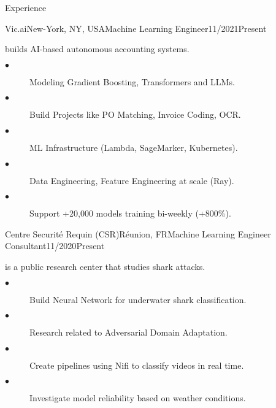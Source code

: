 \documentclass{resume}
\begin{document}
\begin{multicols}{2}
	\begin{rSection}{\Large Experience}
	
		\begin{job}{Vic.ai}{New-York, NY, USA}{Machine Learning Engineer}{11/2021}{Present}{
			builds AI-based autonomous accounting systems.
			\begin{description}
				\item[$\bullet$] Modeling Gradient Boosting, Transformers and LLMs.
				\item[$\bullet$] Build Projects like PO Matching, Invoice Coding, OCR.
				\item[$\bullet$] ML Infrastructure (Lambda, SageMarker, Kubernetes).
				\item[$\bullet$] Data Engineering, Feature Engineering at scale (Ray).
				\item[$\bullet$] Support +20,000 models training bi-weekly (+800\%).
			\end{description}
		}
		\end{job}

		\begin{job}{Centre Securité Requin (CSR)}{Réunion, FR}{Machine Learning Engineer Consultant}{11/2020}{Present}{
			is a public research center that studies shark attacks.
			\begin{description}
				\item[$\bullet$] Build Neural Network for underwater shark classification.
				\item[$\bullet$] Research related to Adversarial Domain Adaptation.
				\item[$\bullet$] Create pipelines using Nifi to classify videos in real time.
				\item[$\bullet$] Investigate model reliability based on weather conditions.
			\end{description}
		}
		\end{job}


\end{rSection}
\end{multicols}
\end{document}
